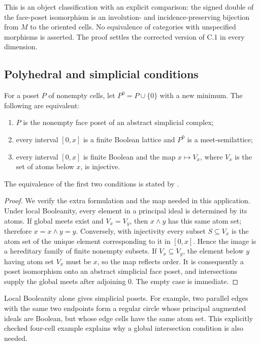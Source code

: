 This is an object classification with an explicit comparison: the
signed double of the face-poset isomorphism is an involution- and
incidence-preserving bijection from $M$ to the oriented cells. No
equivalence of categories with unspecified morphisms is asserted.
The proof settles the corrected version of C.1 in every dimension.

\subsection{Polyhedral and simplicial conditions}

\begin{theorem}
\label{SA21-C09}
For a poset $P$ of nonempty cells, let $P^0=P\cup\{0\}$ with a new
minimum. The following are equivalent:
\begin{enumerate}
\item $P$ is the nonempty face poset of an abstract simplicial complex;
\item every interval $[0,x]$ is a finite Boolean lattice and $P^0$ is a
meet-semilattice;
\item every interval $[0,x]$ is finite Boolean and the map
$x\mapsto V_x$, where $V_x$ is the set of atoms below $x$, is injective.
\end{enumerate}
The equivalence of the first two conditions is stated by
\citet[\S2.3, pp.~8--9]{Bjorner1984}.
\end{theorem}
\begin{proof}
We verify the extra formulation and the map needed in this application.
Under local Booleanity, every element in a principal ideal is determined
by its atoms. If global meets exist and $V_x=V_y$, then $x\wedge y$
has this same atom set; therefore $x=x\wedge y=y$. Conversely, with
injectivity every subset $S\subseteq V_x$ is the atom set of the unique
element corresponding to it in $[0,x]$. Hence the image is a hereditary
family of finite nonempty subsets. If $V_x\subseteq V_y$, the element
below $y$ having atom set $V_x$ must be $x$, so the map reflects order.
It is consequently a poset isomorphism onto an abstract simplicial face
poset, and intersections supply the global meets after adjoining $0$.
The empty case is immediate.
\end{proof}

Local Booleanity alone gives simplicial posets. For example, two parallel
edges with the same two endpoints form a regular circle whose principal
augmented ideals are Boolean, but whose edge cells have the same atom
set. This explicitly checked four-cell example explains why a global
intersection condition is also needed.

